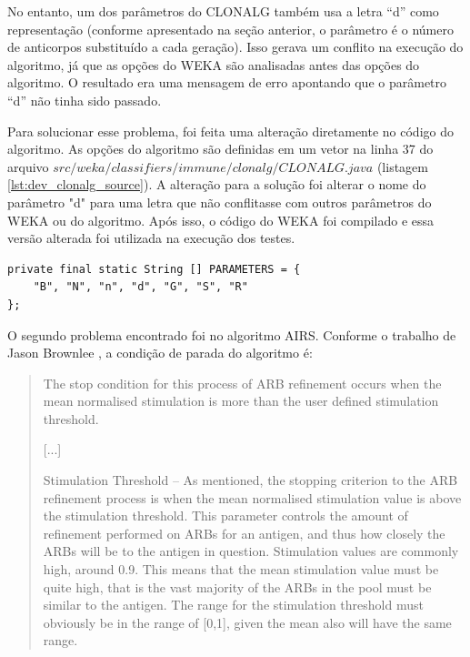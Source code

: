 No entanto, um dos parâmetros do CLONALG também usa a letra ``d'' como representação (conforme apresentado na seção anterior, o parâmetro é o número de anticorpos substituído a cada geração). Isso gerava um conflito na execução do algoritmo, já que as opções do WEKA são analisadas antes das opções do algoritmo. O resultado era uma mensagem de erro apontando que o parâmetro ``d'' não tinha sido passado.

Para solucionar esse problema, foi feita uma alteração diretamente no código do algoritmo. As opções do algoritmo são definidas em um vetor na linha 37 do arquivo $src/weka/classifiers/immune/clonalg/CLONALG.java$ (listagem \ref{lst:dev_clonalg_source}). A alteração para a solução foi alterar o nome do parâmetro "d" para uma letra que não conflitasse com outros parâmetros do WEKA ou do algoritmo. Após isso, o código do WEKA foi compilado e essa versão alterada foi utilizada na execução dos testes.

\vspace{0.5cm}
\begin{lstlisting}[caption=Código fonte original do CLONALG, label=lst:dev_clonalg_source]
private final static String [] PARAMETERS = {
    "B", "N", "n", "d", "G", "S", "R"
};
\end{lstlisting}
\vspace{0.5cm}

O segundo problema encontrado foi no algoritmo AIRS. Conforme o trabalho de Jason Brownlee \cite{Brownlee2005}, a condição de parada do algoritmo é:

\begin{quote}
The stop condition for this process of ARB refinement occurs when the
mean normalised stimulation is more than the user defined stimulation
threshold.

[...]

Stimulation Threshold – As mentioned, the stopping criterion to the ARB
refinement process is when the mean normalised stimulation value is above
the stimulation threshold. This parameter controls the amount of refinement
performed on ARBs for an antigen, and thus how closely the ARBs will be
to the antigen in question. Stimulation values are commonly high, around
0.9. This means that the mean stimulation value must be quite high, that is
the vast majority of the ARBs in the pool must be similar to the antigen.
The range for the stimulation threshold must obviously be in the range of
[0,1], given the mean also will have the same range.
\end{quote}

